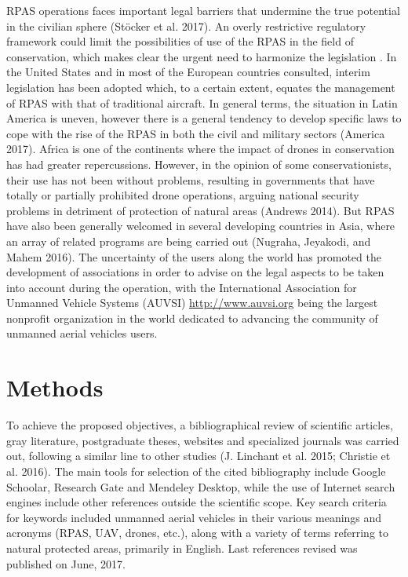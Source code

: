 \documentclass[]{interact}
\theoremstyle{plain}%
\theoremstyle{definition}
\theoremstyle{remark}
\begin{document}
RPAS operations faces important legal barriers that undermine the true
potential in the civilian sphere (Stöcker et al. 2017). An overly
restrictive regulatory framework could limit the possibilities of use of
the RPAS in the field of conservation, which makes clear the urgent need
to harmonize the legislation . In the United States and in most of the
European countries consulted, interim legislation has been adopted
which, to a certain extent, equates the management of RPAS with that of
traditional aircraft. In general terms, the situation in Latin America
is uneven, however there is a general tendency to develop specific laws
to cope with the rise of the RPAS in both the civil and military sectors
(America 2017). Africa is one of the continents where the impact of
drones in conservation has had greater repercussions. However, in the
opinion of some conservationists, their use has not been without
problems, resulting in governments that have totally or partially
prohibited drone operations, arguing national security problems in
detriment of protection of natural areas (Andrews 2014). But RPAS have
also been generally welcomed in several developing countries in Asia,
where an array of related programs are being carried out (Nugraha,
Jeyakodi, and Mahem 2016). The uncertainty of the users along the world
has promoted the development of associations in order to advise on the
legal aspects to be taken into account during the operation, with the
International Association for Unmanned Vehicle Systems (AUVSI)
\url{http://www.auvsi.org} being the largest nonprofit organization in
the world dedicated to advancing the community of unmanned aerial
vehicles users.

\section{Methods}\label{methods}

To achieve the proposed objectives, a bibliographical review of
scientific articles, gray literature, postgraduate theses, websites and
specialized journals was carried out, following a similar line to other
studies (J. Linchant et al. 2015; Christie et al. 2016). The main tools
for selection of the cited bibliography include Google Schoolar,
Research Gate and Mendeley Desktop, while the use of Internet search
engines include other references outside the scientific scope. Key
search criteria for keywords included unmanned aerial vehicles in their
various meanings and acronyms (RPAS, UAV, drones, etc.), along with a
variety of terms referring to natural protected areas, primarily in
English. Last references revised was published on June, 2017.
\end{document}
